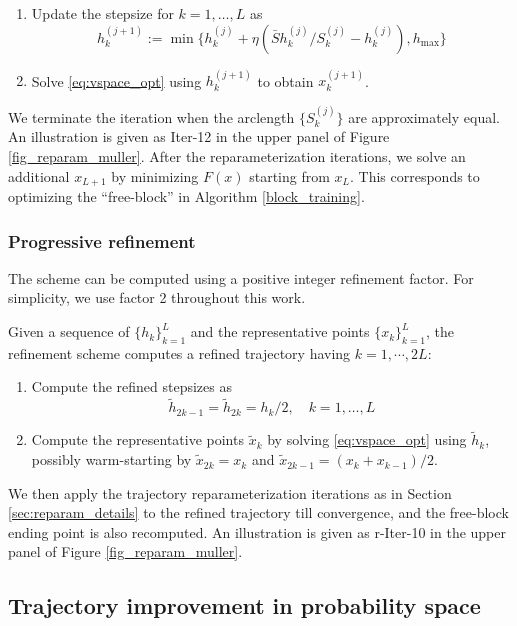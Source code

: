 \documentclass{article}
\theoremstyle{remark}
\theoremstyle{plain}
\begin{document}
{\begin{enumerate}
    \item Update the stepsize for $k=1,\ldots, L$ as
    \[
    h_k^{(j+1)}:={\min\{h_k^{(j)}+\eta (\bar{S}  h_k^{(j)}/S_k^{(j)}-h_k^{(j)}), h_{\max}\}} 
    \]
    
    \item 
    Solve \eqref{eq:vspace_opt} using $h_k^{(j+1)}$ to obtain $x_k^{(j+1)}$.
\end{enumerate}

We terminate the iteration when the arclength $\{S_k^{(j)}\}$ are approximately equal.
An illustration is given as Iter-12 in the upper panel of Figure \ref{fig_reparam_muller}.
After the reparameterization iterations, we solve an additional $x_{L+1}$ by minimizing $F(x)$ starting from $x_L$. 
This corresponds to optimizing the ``free-block'' in Algorithm \ref{block_training}. 


\subsubsection{ Progressive refinement}

The scheme can be computed using a positive integer refinement factor. For simplicity, we use factor 2 throughout this work. 

Given a sequence of $\{ h_k \}_{k=1}^L$ and the representative points $\{x_k\}_{k=1}^{L}$,
the refinement scheme computes a refined trajectory having $k=1,\cdots, 2L$:

\begin{enumerate}
    \item 
    Compute the refined stepsizes as
    \[
    \tilde{h}_{2k-1} = \tilde{h}_{2k} = h_k/2,
    \quad k=1,\dots, L
    \]
    \item 
    Compute the representative points $\tilde{x}_k$ by solving \eqref{eq:vspace_opt} using $\tilde{h}_{k}$,
    possibly warm-starting by $\tilde{x}_{2k} = {x}_{k}$
    and $\tilde{x}_{2k-1} = ({x}_{k}+x_{k-1})/2$.
\end{enumerate} 

We then apply the trajectory reparameterization iterations as in Section \ref{sec:reparam_details} to the refined trajectory till convergence,
and the free-block ending point is also recomputed.
An illustration is given as r-Iter-10 in the upper panel of Figure \ref{fig_reparam_muller}.





\subsection{Trajectory improvement in probability space}

}
\end{document}
